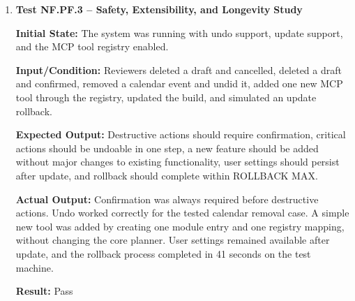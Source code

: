 \documentclass[12pt]{article}
\begin{document}
\begin{enumerate}
    \textbf{Actual Output:} All adverse inputs produced either a clear
    message or a safe cancellation, and none caused a crash. The
    system remained stable for 4.3 hours of continuous use. CPU usage
    samples during the run ranged from 9\% to 24\%, with a mean of
    15.9\% and no sample exceeding APP CPU MAX. Short peaks occurred
    during speech processing and browser actions, but the interface
    remained responsive and no restart was required.
    
    \textbf{Result:} Pass

    \item \textbf{Test NF.PF.3 -- Safety, Extensibility, and Longevity}
    \textbf{Study}
    
    \textbf{Initial State:} The system was running with undo support,
    update support, and the MCP tool registry enabled.
    
    \textbf{Input/Condition:} Reviewers deleted a draft and cancelled,
    deleted a draft and confirmed, removed a calendar event and undid
    it, added one new MCP tool through the registry, updated the
    build, and simulated an update rollback.
    
    \textbf{Expected Output:} Destructive actions should require
    confirmation, critical actions should be undoable in one step, a
    new feature should be added without major changes to existing
    functionality, user settings should persist after update, and
    rollback should complete within ROLLBACK MAX.
    
    \textbf{Actual Output:} Confirmation was always required before
    destructive actions. Undo worked correctly for the tested calendar
    removal case. A simple new tool was added by creating one module
    entry and one registry mapping, without changing the core planner.
    User settings remained available after update, and the rollback
    process completed in 41 seconds on the test machine.
    
    \textbf{Result:} Pass
\end{enumerate}
\end{document}
